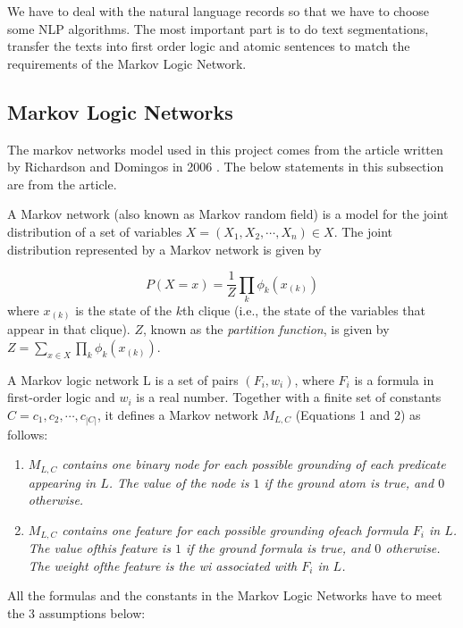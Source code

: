 \documentclass[
12pt, %
a4paper, %
oneside, %
headinclude,footinclude, %
BCOR5mm, %
]{scrartcl}
\begin{document}
We have to deal with the natural language records so that we have to choose some NLP algorithms. The most important part is to do text segmentations, transfer the texts into first order logic and atomic sentences to match the requirements of the Markov Logic Network.

\subsection{Markov Logic Networks}
The markov networks model used in this project comes from the article written by Richardson and Domingos in 2006 \cite{richardson2006markov}. The below statements in this subsection are from the article.

A Markov network (also known as Markov random field) is a model for the joint distribution of a set of variables $X = (X_1,X_2,\cdots,X_n) \in X$. The joint distribution represented by a Markov network is given by


\begin{equation}
    P(X=x)=\frac{1}{Z}\prod_k\phi_k(x_{(k)})
\end{equation}
where $x_{(k)}$ is the state of the $k$th clique (i.e., the state of the variables that appear in that clique). $Z$, known as the \textit{partition function}, is given by $Z=\sum_{x\in X}\prod_k\phi_k(x_{(k)})$.
\begin{definition}
    A Markov logic network L is a set of pairs $(F_i, w_i)$, where $F_i$ is a formula in first-order logic and $w_i$ is a real number. Together with a finite set of constants $C = {c_1,c_2,\cdots,c_{|C|}}$, it defines a Markov network $M_{L,C}$ (Equations 1 and 2) as follows:
\end{definition}

\begin{enumerate}[noitemsep]
    \item \textit{$M_{L,C}$ contains one binary node for each possible grounding of each predicate appearing in $L$. The value of the node is $1$ if the ground atom is true, and $0$ otherwise.}
    \item \textit{$M_{L,C}$ contains one feature for each possible grounding ofeach formula $F_i$ in $L$. The value ofthis feature is $1$ if the ground formula is true, and $0$ otherwise. The weight ofthe feature is the wi associated with $F_i$ in $L$.}
\end{enumerate}

All the formulas and the constants in the Markov Logic Networks have to meet the $3$ assumptions below:
\end{document}
